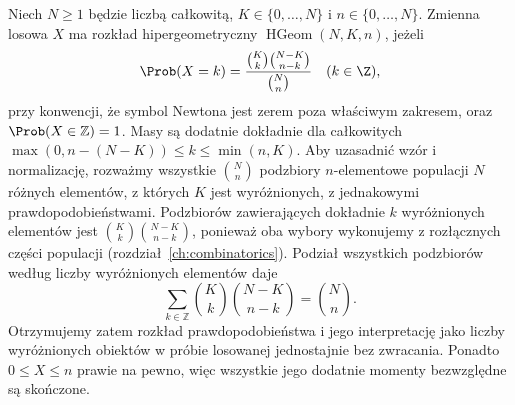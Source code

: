 \begin{definicja}
Niech $N\geq1$ będzie liczbą całkowitą,
$K\in\{0,\ldots,N\}$ i $n\in\{0,\ldots,N\}$.
Zmienna losowa $X$ ma rozkład hipergeometryczny
$\operatorname{HGeom}(N,K,n)$, jeżeli
\begin{equation}\label{eq:hypergeom}
\Prob(X=k)=\frac{\binom Kk\binom{N-K}{n-k}}{\binom Nn}
\quad(k\in\Z),
\end{equation}
przy konwencji, że symbol Newtona jest zerem poza właściwym zakresem,
oraz $\Prob(X\in\mathbb Z)=1$.
Masy są dodatnie dokładnie dla całkowitych
$\max(0,n-(N-K))\leq k\leq\min(n,K)$.
Aby uzasadnić wzór i normalizację, rozważmy wszystkie
$\binom Nn$ podzbiory $n$-elementowe populacji $N$ różnych
elementów, z których $K$ jest wyróżnionych, z jednakowymi
prawdopodobieństwami. Podzbiorów zawierających dokładnie
$k$ wyróżnionych elementów jest $\binom Kk\binom{N-K}{n-k}$,
ponieważ oba wybory wykonujemy z rozłącznych części populacji
(rozdział~\ref{ch:combinatorics}). Podział wszystkich
podzbiorów według liczby wyróżnionych elementów daje
\[
\sum_{k\in\mathbb Z}\binom Kk\binom{N-K}{n-k}=\binom Nn.
\]
Otrzymujemy zatem rozkład prawdopodobieństwa i jego
interpretację jako liczby wyróżnionych obiektów w próbie
losowanej jednostajnie bez zwracania. Ponadto $0\leq X\leq n$
prawie na pewno, więc wszystkie jego dodatnie momenty
bezwzględne są skończone.
\end{definicja}


